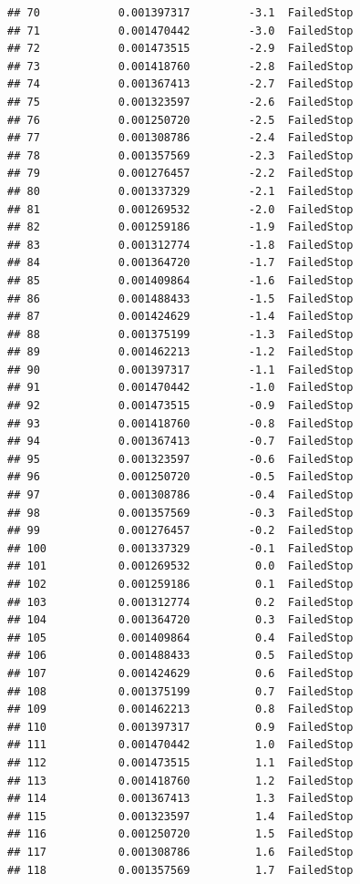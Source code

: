 \documentclass[
]{article}
\begin{document}
\begin{verbatim}
## 70            0.001397317         -3.1  FailedStop
## 71            0.001470442         -3.0  FailedStop
## 72            0.001473515         -2.9  FailedStop
## 73            0.001418760         -2.8  FailedStop
## 74            0.001367413         -2.7  FailedStop
## 75            0.001323597         -2.6  FailedStop
## 76            0.001250720         -2.5  FailedStop
## 77            0.001308786         -2.4  FailedStop
## 78            0.001357569         -2.3  FailedStop
## 79            0.001276457         -2.2  FailedStop
## 80            0.001337329         -2.1  FailedStop
## 81            0.001269532         -2.0  FailedStop
## 82            0.001259186         -1.9  FailedStop
## 83            0.001312774         -1.8  FailedStop
## 84            0.001364720         -1.7  FailedStop
## 85            0.001409864         -1.6  FailedStop
## 86            0.001488433         -1.5  FailedStop
## 87            0.001424629         -1.4  FailedStop
## 88            0.001375199         -1.3  FailedStop
## 89            0.001462213         -1.2  FailedStop
## 90            0.001397317         -1.1  FailedStop
## 91            0.001470442         -1.0  FailedStop
## 92            0.001473515         -0.9  FailedStop
## 93            0.001418760         -0.8  FailedStop
## 94            0.001367413         -0.7  FailedStop
## 95            0.001323597         -0.6  FailedStop
## 96            0.001250720         -0.5  FailedStop
## 97            0.001308786         -0.4  FailedStop
## 98            0.001357569         -0.3  FailedStop
## 99            0.001276457         -0.2  FailedStop
## 100           0.001337329         -0.1  FailedStop
## 101           0.001269532          0.0  FailedStop
## 102           0.001259186          0.1  FailedStop
## 103           0.001312774          0.2  FailedStop
## 104           0.001364720          0.3  FailedStop
## 105           0.001409864          0.4  FailedStop
## 106           0.001488433          0.5  FailedStop
## 107           0.001424629          0.6  FailedStop
## 108           0.001375199          0.7  FailedStop
## 109           0.001462213          0.8  FailedStop
## 110           0.001397317          0.9  FailedStop
## 111           0.001470442          1.0  FailedStop
## 112           0.001473515          1.1  FailedStop
## 113           0.001418760          1.2  FailedStop
## 114           0.001367413          1.3  FailedStop
## 115           0.001323597          1.4  FailedStop
## 116           0.001250720          1.5  FailedStop
## 117           0.001308786          1.6  FailedStop
## 118           0.001357569          1.7  FailedStop

\end{verbatim}
\end{document}

